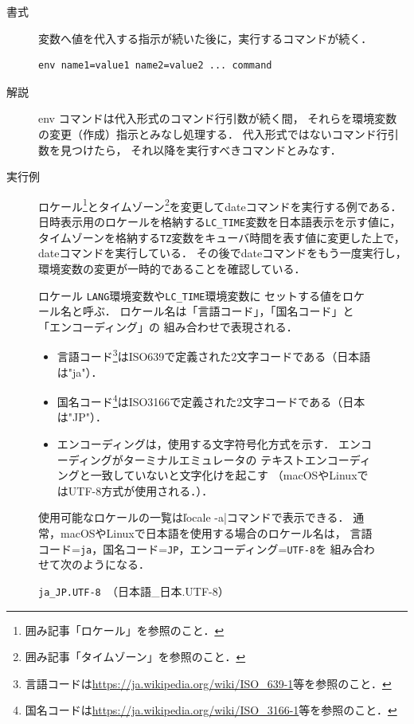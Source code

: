 \begin{description}
\item [書式]
  変数へ値を代入する指示が続いた後に，実行するコマンドが続く．
\begin{lstlisting}[numbers=none]
  env name1=value1 name2=value2 ... command
\end{lstlisting}
\item [解説]
  env コマンドは代入形式のコマンド行引数が続く間，
  それらを環境変数の変更（作成）指示とみなし処理する．
  代入形式ではないコマンド行引数を見つけたら，
  それ以降を実行すべきコマンドとみなす．
\item [実行例]
  ロケール\footnote{
    囲み記事「ロケール」を参照のこと．
  }とタイムゾーン\footnote{
    囲み記事「タイムゾーン」を参照のこと．
  }を変更してdateコマンドを実行する例である．
  日時表示用のロケールを格納する\texttt{LC\_TIME}変数を日本語表示を示す値に，
  タイムゾーンを格納する\texttt{TZ}変数をキューバ時間を表す値に変更した上で，
  dateコマンドを実行している．
  その後でdateコマンドをもう一度実行し，
  環境変数の変更が一時的であることを確認している．
  
\end{description}

\begin{figure}[btp]
\begin{itembox}[l]{ロケール}
\texttt{LANG}環境変数や\texttt{LC\_TIME}環境変数に
セットする値をロケール名と呼ぶ．
ロケール名は「言語コード」，「国名コード」と「エンコーディング」の
組み合わせで表現される．

\begin{itemize}
\item
  言語コード\footnote{
  言語コードは\url{https://ja.wikipedia.org/wiki/ISO_639-1}等を参照のこと．
  }はISO639で定義された2文字コードである（日本語は"ja"）．
\item 
  国名コード\footnote{
    国名コードは\url{https://ja.wikipedia.org/wiki/ISO_3166-1}等を参照のこと．
  }はISO3166で定義された2文字コードである（日本は"JP"）．
\item
  エンコーディングは，使用する文字符号化方式を示す．
  エンコーディングがターミナルエミュレータの
  テキストエンコーディングと一致していないと文字化けを起こす
  （macOSやLinuxではUTF-8方式が使用される．）．
\end{itemize}

使用可能なロケールの一覧は\|locale -a|コマンドで表示できる．
通常，macOSやLinuxで日本語を使用する場合のロケール名は，
言語コード=\texttt{ja}，国名コード=\texttt{JP}，エンコーディング=\texttt{UTF-8}を
組み合わせて次のようになる．

\centerline{\texttt{ja\_JP.UTF-8 }（日本語\_日本.UTF-8）}
\end{itembox}
\end{figure}

